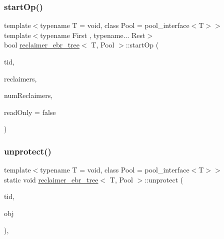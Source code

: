 \mbox{\label{classreclaimer__ebr__tree_a3f049dc3decd80d6b2e22cc0af668efa}} 
\subsubsection{\texorpdfstring{start\+Op()}{startOp()}}
{\footnotesize\ttfamily template$<$typename T  = void, class Pool  = pool\+\_\+interface$<$\+T$>$$>$ \\
template$<$typename First , typename... Rest$>$ \\
bool \hyperlink{classreclaimer__ebr__tree}{reclaimer\+\_\+ebr\+\_\+tree}$<$ T, Pool $>$\+::start\+Op (\begin{DoxyParamCaption}\item[{const int}]{tid,  }\item[{void $\ast$const $\ast$const}]{reclaimers,  }\item[{const int}]{num\+Reclaimers,  }\item[{const bool}]{read\+Only = {\ttfamily false} }\end{DoxyParamCaption})\hspace{0.3cm}{\ttfamily [inline]}}

\mbox{\label{classreclaimer__ebr__tree_ac574b08de5fbfb4c70248cf9cbfb3d26}} 
\subsubsection{\texorpdfstring{unprotect()}{unprotect()}}
{\footnotesize\ttfamily template$<$typename T  = void, class Pool  = pool\+\_\+interface$<$\+T$>$$>$ \\
static void \hyperlink{classreclaimer__ebr__tree}{reclaimer\+\_\+ebr\+\_\+tree}$<$ T, Pool $>$\+::unprotect (\begin{DoxyParamCaption}\item[{const int}]{tid,  }\item[{T $\ast$const}]{obj }\end{DoxyParamCaption})\hspace{0.3cm}{\ttfamily [inline]}, {\ttfamily [static]}}



